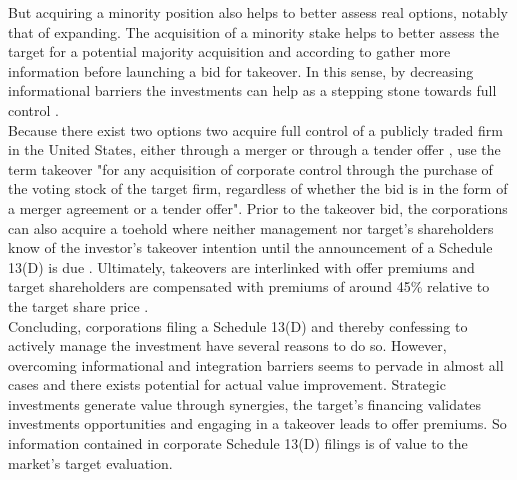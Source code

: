 \documentclass[12pt]{article}
\begin{document}
But acquiring a minority position also helps to better assess real options, notably that of expanding. The acquisition of a minority stake helps to better assess the target for a potential majority acquisition \citep{Ouimet2013} and according to \citet[p.30]{Huang2017} gather more information before launching a bid for takeover. In this sense, by decreasing informational barriers the investments can help as a stepping stone towards full control \citep[p.3]{Huang2017}.\\
Because there exist two options two acquire full control of a publicly traded firm in the United States, either through a merger or through a tender offer \citep[p.2]{Offenberg2015}, \citet[p.1]{Betton2008} use the term takeover "for any acquisition of corporate control through the purchase of the voting stock of the target firm, regardless of whether the bid is in the form of a merger agreement or a tender offer".
Prior to the takeover bid, the corporations can also acquire a toehold where neither management nor target's shareholders know of the investor's takeover intention until the announcement of a Schedule 13(D) is due \citep[p.158]{Eckbo2009}. Ultimately, takeovers are interlinked with offer premiums and target shareholders are compensated with premiums of around 45\% relative to the target share price \citep[p.154]{Eckbo2009}.\\
Concluding, corporations filing a Schedule 13(D) and thereby confessing to actively manage the investment have several reasons to do so. However, overcoming informational and integration barriers seems to pervade in almost all cases and there exists potential for actual value improvement. Strategic investments generate value through synergies, the target's financing validates investments opportunities and engaging in a takeover leads to offer premiums. So information contained in corporate Schedule 13(D) filings is of value to the market's target evaluation. 
\end{document}
